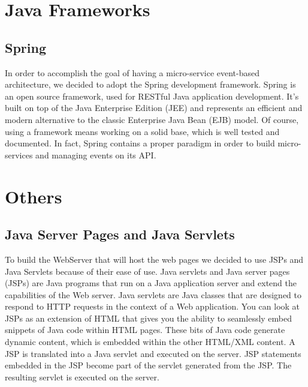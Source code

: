 \section{Java Frameworks}

\subsection{Spring}
In order to accomplish the goal of having a micro-service event-based architecture, we decided to adopt the Spring development framework.
Spring is an open source framework, used for RESTful Java application development. It's built on top of the Java Enterprise Edition (JEE) and represents an efficient and modern alternative to the classic Enterprise Java Bean (EJB) model. Of course, using a framework means working on a solid base, which is well tested and documented. In fact, Spring contains a proper paradigm in order to build micro-services and managing events on its API.

\section{Others}

\subsection{Java Server Pages and Java Servlets}

To build the WebServer that will host the web pages we decided to use JSPs and Java Servlets because of their ease of use.
Java servlets and Java server pages (JSPs) are Java programs that run on a Java application server and extend the capabilities of the Web server. Java servlets are Java classes that are designed to respond to HTTP requests in the context of a Web application. You can look at JSPs as an extension of HTML that gives you the ability to seamlessly embed snippets of Java code within HTML pages. These bits of Java code generate dynamic content, which is embedded within the other HTML/XML content. A JSP is translated into a Java servlet and executed on the server. JSP statements embedded in the JSP become part of the servlet generated from the JSP. The resulting servlet is executed on the server. 